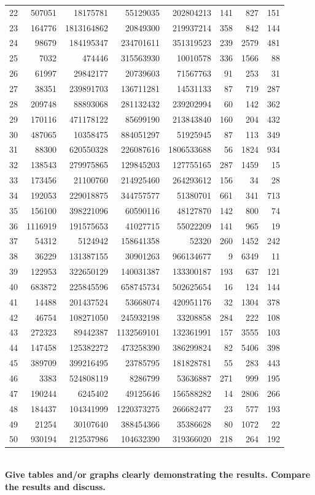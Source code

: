\documentclass[11pt]{article}
\begin{document}
\begin{tabular}{rrrrrrrr}
22 & 507051 & 18175781 & 55129035 & 202804213 & 141 & 827 & 151 \\
23 & 164776 & 1813164862 & 20849300 & 219937214 & 358 & 842 & 144 \\
24 & 98679 & 184195347 & 234701611 & 351319523 & 239 & 2579 & 481 \\
25 & 7032 & 474446 & 315563930 & 10010578 & 336 & 1566 & 88 \\
26 & 61997 & 29842177 & 20739603 & 71567763 & 91 & 253 & 31 \\
27 & 38351 & 239891703 & 136711281 & 14531133 & 87 & 719 & 287 \\
28 & 209748 & 88893068 & 281132432 & 239202994 & 60 & 142 & 362 \\
29 & 170116 & 471178122 & 85699190 & 213843840 & 160 & 204 & 432 \\
30 & 487065 & 10358475 & 884051297 & 51925945 & 87 & 113 & 349 \\
31 & 88300 & 620550328 & 226087616 & 1806533688 & 56 & 1824 & 934 \\
32 & 138543 & 279975865 & 129845203 & 127755165 & 287 & 1459 & 15 \\
33 & 173456 & 21100760 & 214925460 & 264293612 & 156 & 34 & 28 \\
34 & 192053 & 229018875 & 344757577 & 51380701 & 661 & 341 & 713 \\
35 & 156100 & 398221096 & 60590116 & 48127870 & 142 & 800 & 74 \\
36 & 1116919 & 191575653 & 41027715 & 55022209 & 141 & 965 & 19 \\
37 & 54312 & 5124942 & 158641358 & 52320 & 260 & 1452 & 242 \\
38 & 36229 & 131387155 & 30901263 & 966134677 & 9 & 6349 & 11 \\
39 & 122953 & 322650129 & 140031387 & 133300187 & 193 & 637 & 121 \\
40 & 683872 & 225845596 & 658745734 & 502625654 & 16 & 124 & 144 \\
41 & 14488 & 201437524 & 53668074 & 420951176 & 32 & 1304 & 378 \\
42 & 46754 & 108271050 & 245932198 & 33208858 & 284 & 222 & 108 \\
43 & 272323 & 89442387 & 1132569101 & 132361991 & 157 & 3555 & 103 \\
44 & 147458 & 125382272 & 473258390 & 386299824 & 82 & 5406 & 398 \\
45 & 389709 & 399216495 & 23785795 & 181828781 & 55 & 283 & 443 \\
46 & 3383 & 524808119 & 8286799 & 53636887 & 271 & 999 & 195 \\
47 & 190244 & 6245402 & 49125646 & 156588282 & 14 & 2806 & 266 \\
48 & 184437 & 104341999 & 1220373275 & 266682477 & 23 & 577 & 193 \\
49 & 21254 & 30107640 & 388454366 & 35386628 & 80 & 1072 & 22 \\
50 & 930194 & 212537986 & 104632390 & 319366020 & 218 & 264 & 192 \\
\hline
\end{tabular} \\
{\bf Give tables and/or graphs clearly demonstrating the results. Compare the results and discuss.  }
\end{document}
